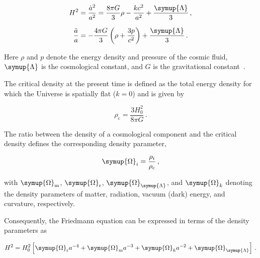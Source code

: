 \begin{equation}
    H^2 = \frac{\dot{a}^2}{a^2} = \frac{8 \pi G}{3} \rho - \frac{k c^2}{a^2} + \frac{\symup{\Lambda}}{3} \,,
\end{equation}

\begin{equation}
    \frac{\ddot{a}}{a} = -\frac{4 \pi G}{3} \left( \rho + \frac{3 p}{c^2} \right) + \frac{\symup{\Lambda}}{3} \,.
\end{equation}

Here $\rho$ and $p$ denote the energy density and pressure of the cosmic fluid, 
$\symup{\Lambda}$ is the cosmological constant, and $G$ is the gravitational constant~\cite{Huterer_2018}.

The critical density at the present time is defined as the total energy density for which the Universe is spatially flat ($k=0$) and is given by

\begin{equation}
    \rho_{\mathrm{c}}=\frac{3H_0^2}{8\pi G} \,.
\end{equation}

The ratio between the density of a cosmological component and the critical 
density defines the corresponding density parameter,

\begin{equation}
    \symup{\Omega}_i=\frac{\rho_i}{\rho_{\mathrm{c}}} \,,
\end{equation}

with $\symup{\Omega}_{\mathrm{m}}$, $\symup{\Omega}_{\mathrm{r}}$, $\symup{\Omega}_{\symup{\Lambda}}$, and $\symup{\Omega}_k$ 
denoting the density parameters of matter, radiation, vacuum (dark) energy, and curvature, respectively.

Consequently, the Friedmann equation can be expressed in terms of the density parameters as~\cite{BartelmannSchneider_2001} 

\begin{equation}
    H^2 = H_0^2 \left[  \symup{\Omega}_{\mathrm{r}} a^{-4} + \symup{\Omega}_{\mathrm{m}} a^{-3} + \symup{\Omega}_{k} a^{-2} + \symup{\Omega}_{\symup{\Lambda}} \right] \,.
\end{equation}

%

